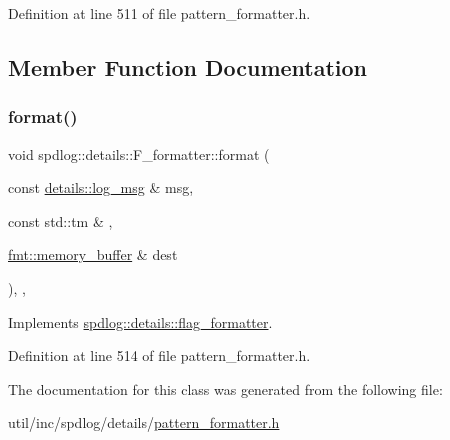 Definition at line 511 of file pattern\+\_\+formatter.\+h.



\subsection{Member Function Documentation}
\mbox{\label{classspdlog_1_1details_1_1_f__formatter_a1ff6475bf808c73612748c55fe3883c2}} 
\subsubsection{\texorpdfstring{format()}{format()}}
{\footnotesize\ttfamily void spdlog\+::details\+::\+F\+\_\+formatter\+::format (\begin{DoxyParamCaption}\item[{const \hyperlink{structspdlog_1_1details_1_1log__msg}{details\+::log\+\_\+msg} \&}]{msg,  }\item[{const std\+::tm \&}]{,  }\item[{\hyperlink{format_8h_a21cbf729f69302f578e6db21c5e9e0d2}{fmt\+::memory\+\_\+buffer} \&}]{dest }\end{DoxyParamCaption})\hspace{0.3cm}{\ttfamily [inline]}, {\ttfamily [override]}, {\ttfamily [virtual]}}



Implements \hyperlink{classspdlog_1_1details_1_1flag__formatter_a33fb3e42a4c8200cceb833d92b53fb67}{spdlog\+::details\+::flag\+\_\+formatter}.



Definition at line 514 of file pattern\+\_\+formatter.\+h.



The documentation for this class was generated from the following file\+:\begin{DoxyCompactItemize}
\item 
util/inc/spdlog/details/\hyperlink{pattern__formatter_8h}{pattern\+\_\+formatter.\+h}\end{DoxyCompactItemize}
